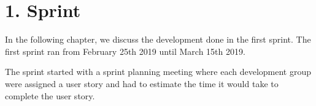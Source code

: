 \chapter{1. Sprint}
In the following chapter, we discuss the development done in the first sprint.
The first sprint ran from February 25th 2019 until March 15th 2019.

The sprint started with a sprint planning meeting where each development group were assigned a user story and had to estimate the time it would take to complete the user story.

